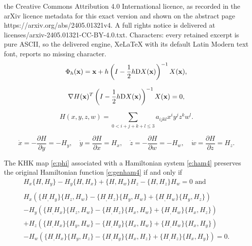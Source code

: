 \documentclass[10pt,a4paper]{amsart}
\begin{document}
the Creative Commons Attribution 4.0 International licence, as recorded in the arXiv licence metadata for this exact version and shown on the abstract page https://arxiv.org/abs/2405.01321v4. A full rights notice is delivered at licenses/arxiv-2405.01321-CC-BY-4.0.txt. Characters: every retained excerpt is pure ASCII, so the delivered engine, XeLaTeX with its default Latin Modern text font, reports no missing character.
\begin{equation}\label{e:phi}
\Phi_h(\mathbf{x})=\mathbf{x}+h\left(I-\frac{1}{2}h {\mathrm D}X({\bf{x}})\right)^{-1} X({\bf{x}}),
\end{equation}

\begin{equation}\label{e:restriction}
  \nabla H({\bf{x}})^T\left(I-\frac{1}{2}h{\mathrm D}X({\bf{x}})\right)^{-1} X({\bf{x}})=0,
\end{equation}

 \begin{equation}\label{e:genham4}
H(x,y,z,w)=\displaystyle{\sum\limits_{0< i+j+k+l\leq 3}
} a_{ijkl}x^iy^jz^kw^l.
 \end{equation}

\begin{equation}\label{e:ham4}
 \dot{x}=-\dfrac{\partial H}{\partial y}=-H_y, \quad
\dot{y}=\dfrac{\partial H}{\partial x}=H_x,\quad
\dot{z}=-\dfrac{\partial H}{\partial w}=-H_w, \quad
\dot{w}=\dfrac{\partial H}{\partial z}=H_z.
\end{equation}

\begin{lemma}\label{l:invr4}
The KHK map \eqref{e:phi} associated with a  Hamiltonian system \eqref{e:ham4} preserves the original Hamiltonian function \eqref{e:genham4} if and only if
\begin{equation}\label{e:condicioar4}
\begin{array}{l}
H_x\{H,H_y\}-H_y\{H,H_x\}+\{H,H_w\}H_z-\{H,H_z\}H_w=0 \mbox{ and}\\
\\
H_x\left(\{H_,H_y\}\{H_z,H_w\}-\{H_,H_z\}\{H_y,H_w\}+\{H_,H_w\}\{H_y,H_z\}\right)\\
-H_y\left(\{H_,H_x\}\{H_z,H_w\}-\{H_,H_z\}\{H_x,H_w\}+\{H_,H_w\}\{H_x,H_z\}\right)\\
+H_z\left(\{H_,H_x\}\{H_y,H_w\}-\{H_,H_y\}\{H_x,H_w\}+\{H_,H_w\}\{H_x,H_y\}\right)\\
-H_w\left(\{H_,H_x\}\{H_y,H_z\}-\{H_,H_y\}\{H_x,H_z\}+\{H_,H_z\}\{H_x,H_y\}\right)=0.
\end{array}
\end{equation}
 \end{lemma}
\end{document}
